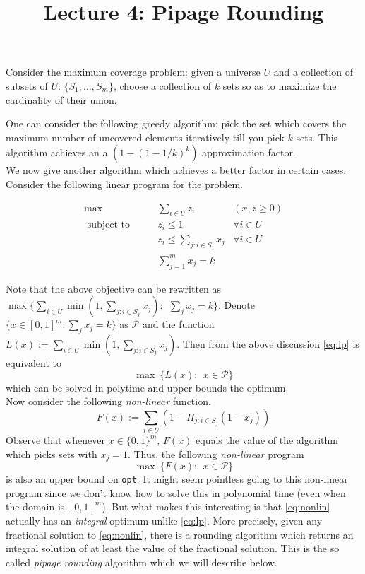 \documentclass[11pt]{article}
\def\opt{{\tt opt}}
\begin{document}
\title{Lecture 4:  Pipage Rounding}
\author{}
\date{}
\maketitle
\noindent
Consider the maximum coverage problem: given a universe $U$ and a collection 
of subsets of $U$: $\{S_1,\ldots,S_m\}$, choose a collection of $k$ sets so as to 
maximize the cardinality of their union.  

One can consider the following greedy algorithm: pick the set which covers the maximum number of uncovered elements iteratively till you pick $k$ sets. This algorithm achieves an a $(1 - (1-1/k)^k)$ approximation factor. \\

\noindent
We now give another algorithm which achieves a better factor in certain cases.
Consider the following linear program for the problem.

\begin{align}
\max & \qquad \sum_{i\in U} z_i & (x,z \ge 0) \label{eq:lp} \\
\mbox{ subject to} & \qquad z_i \le 1 & \forall i\in U \\
			    & \qquad z_i \le \sum_{j: i\in S_j} x_j & \forall i\in U \\
			    & \qquad \sum_{j=1}^m x_j  = k & 
\end{align}

\def\P{{\mathcal P}}
Note that the above objective can be rewritten as $\max \{\sum_{i\in U} \min(1, \sum_{j:i\in S_j} x_j): ~~\sum_j x_j = k\}$. Denote $\{x\in [0,1]^m: \sum_j x_j = k\}$ as $\P$ and the function $L(x) := \sum_{i\in U} \min(1, \sum_{j:i\in S_j} x_j)$. Then from the above discussion \eqref{eq:lp}
is equivalent to 
\begin{equation}\label{eq:lin}\max ~\{L(x): ~~x\in \P\}\end{equation}
which can be solved in polytime and upper bounds the optimum.\\

\noindent
Now consider the following {\em non-linear} function. 
$$F(x) := \sum_{i\in U}\left(1 - \Pi_{j: i\in S_j} (1 - x_j) \right)$$ 
Observe that whenever $x\in \{0,1\}^m$, $F(x)$ equals the value of the algorithm 
which picks sets with $x_j = 1$. Thus, the following {\em non-linear} program 
\begin{equation}\label{eq:nonlin}\max ~\{F(x): ~~x\in \P\}\end{equation}
 is also an upper bound on \opt. It might seem pointless going to this non-linear program since we don't know how to solve this in polynomial time (even when the domain is $[0,1]^m$). But what makes this interesting is that  \eqref{eq:nonlin} actually has an {\em integral} optimum unlike \eqref{eq:lp}. More precisely, given any fractional solution to \eqref{eq:nonlin}, there is a rounding algorithm which returns an integral solution of at least the value of the fractional solution. This is the so called {\em pipage rounding} algorithm which we will describe below.
 
\end{document}
